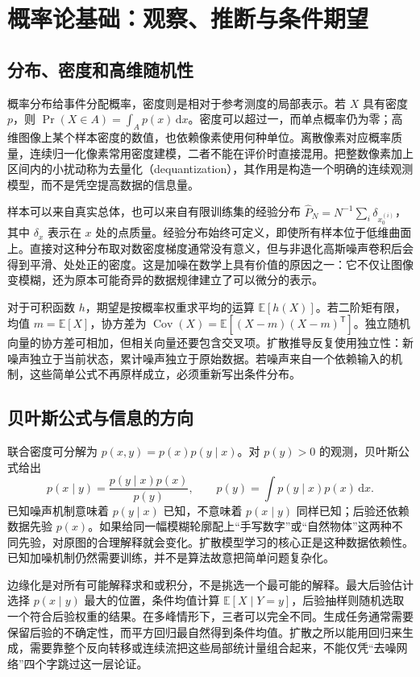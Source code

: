 \documentclass[UTF8,12pt,a4paper,fontset=fandol]{ctexart}
\begin{document}
\section{概率论基础：观察、推断与条件期望}
\label{sec:diff-probability}
\subsection{分布、密度和高维随机性}
概率分布给事件分配概率，密度则是相对于参考测度的局部表示。若 $X$ 具有密度 $p$，则 $\Pr(X\in A)=\int_A p(x)\,\mathrm dx$。密度可以超过一，而单点概率仍为零；高维图像上某个样本密度的数值，也依赖像素使用何种单位。离散像素对应概率质量，连续归一化像素常用密度建模，二者不能在评价时直接混用。把整数像素加上区间内的小扰动称为去量化（dequantization），其作用是构造一个明确的连续观测模型，而不是凭空提高数据的信息量。

样本可以来自真实总体，也可以来自有限训练集的经验分布 $\widehat P_N=N^{-1}\sum_i\delta_{x_0^{(i)}}$，其中 $\delta_x$ 表示在 $x$ 处的点质量。经验分布始终可定义，即使所有样本位于低维曲面上。直接对这种分布取对数密度梯度通常没有意义，但与非退化高斯噪声卷积后会得到平滑、处处正的密度。这是加噪在数学上具有价值的原因之一：它不仅让图像变模糊，还为原本可能奇异的数据规律建立了可以微分的表示。

对于可积函数 $h$，期望是按概率权重求平均的运算 $\mathbb E[h(X)]$。若二阶矩有限，均值 $m=\mathbb E[X]$，协方差为 $\operatorname{Cov}(X)=\mathbb E[(X-m)(X-m)^\mathsf T]$。独立随机向量的协方差可相加，但相关向量还要包含交叉项。扩散推导反复使用独立性：新噪声独立于当前状态，累计噪声独立于原始数据。若噪声来自一个依赖输入的机制，这些简单公式不再原样成立，必须重新写出条件分布。

\subsection{贝叶斯公式与信息的方向}
联合密度可分解为 $p(x,y)=p(x)p(y\mid x)$。对 $p(y)>0$ 的观测，贝叶斯公式给出
\begin{equation}
 p(x\mid y)=\frac{p(y\mid x)p(x)}{p(y)},\qquad
 p(y)=\int p(y\mid x)p(x)\,\mathrm dx.
 \label{eq:diff-bayes}
\end{equation}
已知噪声机制意味着 $p(y\mid x)$ 已知，不意味着 $p(x\mid y)$ 同样已知；后验还依赖数据先验 $p(x)$。如果给同一幅模糊轮廓配上“手写数字”或“自然物体”这两种不同先验，对原图的合理解释就会变化。扩散模型学习的核心正是这种数据依赖性。已知加噪机制仍然需要训练，并不是算法故意把简单问题复杂化。

边缘化是对所有可能解释求和或积分，不是挑选一个最可能的解释。最大后验估计选择 $p(x\mid y)$ 最大的位置，条件均值计算 $\mathbb E[X\mid Y=y]$，后验抽样则随机选取一个符合后验权重的结果。在多峰情形下，三者可以完全不同。生成任务通常需要保留后验的不确定性，而平方回归最自然得到条件均值。扩散之所以能用回归来生成，需要靠整个反向转移或连续流把这些局部统计量组合起来，不能仅凭“去噪网络”四个字跳过这一层论证。
\end{document}
